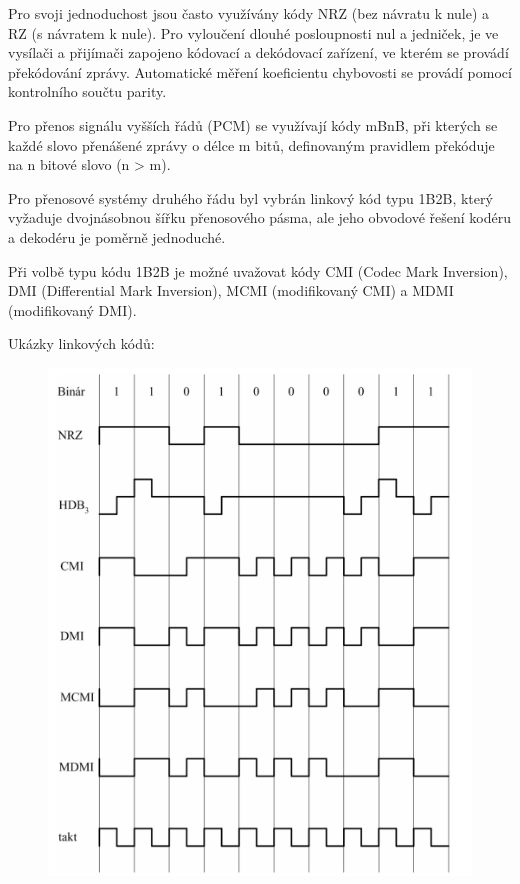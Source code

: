 Pro svoji jednoduchost jsou často využívány kódy NRZ (bez návratu k nule) a RZ (s návratem k nule). Pro vyloučení dlouhé posloupnosti nul a jedniček, je ve vysílači a přijímači zapojeno kódovací a dekódovací zařízení, ve kterém se provádí překódování zprávy. Automatické měření koeficientu chybovosti se provádí pomocí kontrolního součtu parity.

Pro přenos signálu vyšších řádů (PCM) se využívají kódy mBnB, při kterých se každé slovo přenášené zprávy o délce m bitů, definovaným pravidlem překóduje na n bitové slovo (n > m).

Pro přenosové systémy druhého řádu byl vybrán linkový kód typu 1B2B, který vyžaduje dvojnásobnou šířku přenosového pásma, ale jeho obvodové řešení kodéru a dekodéru je poměrně jednoduché.

Při volbě typu kódu 1B2B je možné uvažovat kódy CMI (Codec Mark Inversion), DMI (Differential Mark Inversion), MCMI (modifikovaný CMI) a MDMI (modifikovaný DMI). 

Ukázky linkových kódů:
\begin{figure}[!ht]
\begin{center}
    \includegraphics[scale=1]{obrazky/linkody.png}
  \end{center}
\end{figure}

